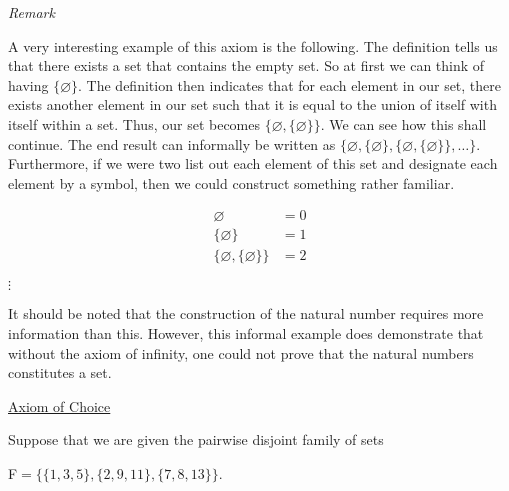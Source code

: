 \documentclass[12pt, a4paper]{article}
\begin{document}
\vspace{6mm}

\noindent\large\textit{Remark}\normalsize\par

\vspace{4mm}

\noindent A very interesting example of this axiom is the following. The definition tells us that there exists a set that contains the empty set. So at first we can think of having $\{\varnothing\}$. The definition then indicates that for each element in our set, there exists another element in our set such that it is equal to the union of itself with itself within a set. Thus, our set becomes $\{\varnothing,\{\varnothing\}\}$. We can see how this shall continue. The end result can informally be written as $\{\varnothing,\{\varnothing\},\{\varnothing,\{\varnothing\}\},\ldots\}$. Furthermore, if we were two list out each element of this set and designate each element by a symbol, then we could construct something rather familiar.\par

\begin{align*} 
\varnothing &=  0 \\ 
\{\varnothing\} &=  1 \\
\{\varnothing,\{\varnothing\}\} &= 2
\end{align*}

\hspace{80mm}$\vdots$\par

\vspace{6mm}

\noindent It should be noted that the construction of the natural number requires more information than this. However, this informal example does demonstrate that without the axiom of infinity, one could not prove that the natural numbers constitutes a set.\par

\vspace{6mm}

\noindent\large{\underline{Axiom of Choice}}\normalsize

\vspace{4mm}

\noindent Suppose that we are given the pairwise disjoint family of sets\par

\vspace{4mm}

\centerline{\rsfs F\hspace{2mm}$ =\{\{1,3,5\},\{2,9,11\},\{7,8,13\}\}$\rm .}
\end{document}
